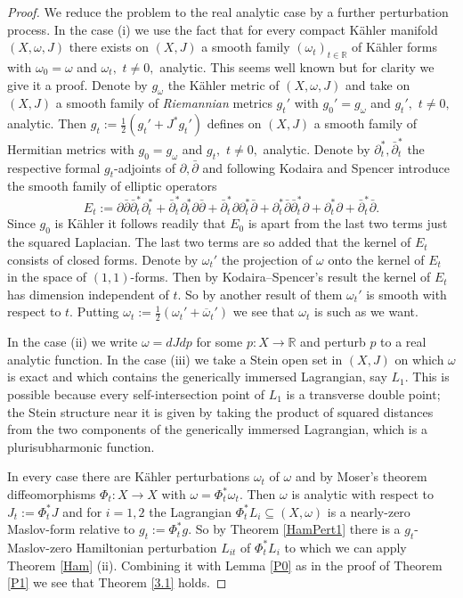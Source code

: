 \documentclass{article}
\theoremstyle{plain}%
\theoremstyle{definition}
\numberwithin{equation}{section}
\numberwithin{figure}{section}
\def\R{{\mathbin{\mathbb R}}}
\def\om{\omega}
\def\Ph{\Phi}
\def\d{{\partial}}
\def\db{\bar\d}%
\def\ov{\overline}
\def\hf{{\frac{1}{2}}}
\def\sb{\subseteq}
\begin{document}
\begin{proof}
We reduce the problem to the real analytic case by a further perturbation process.
In the case (i) we use the fact that
for every compact K\"ahler manifold $(X,\om,J)$
there exists on $(X,J)$ a smooth family $(\om_t)_{t\in\R}$ of K\"ahler forms with $\om_0=\om$ and $\om_t,$ $t\ne0,$ analytic.
This seems well known but for clarity we give it a proof.
Denote by $g_\om$ the K\"ahler metric of $(X,\om,J)$
and take on $(X,J)$ a smooth family of {\it Riemannian} metrics $g_t'$
with $g_0'=g_\om$ and $g_t',$ $t\ne0,$ analytic.
Then $g_t:=\hf(g_t'+J^*g_t')$ defines on $(X,J)$ a smooth family of Hermitian metrics with
$g_0=g_\om$ and $g_t,$ $t\ne0,$ analytic.
Denote by $\d_t^*,\db_t^*$ the respective formal $g_t$-adjoints of $\d,\db$
and following Kodaira and Spencer \cite[\S6]{KS}
introduce the smooth family of elliptic operators
\[E_t:=\d\db\db_t^*\d_t^*+\db_t^*\d_t^*\d\db+\db_t^*\d\d_t^*\db+
\d_t^*\db\db_t^*\d+\d_t^*\d+\db_t^*\db.\]
Since $g_0$ is K\"ahler it follows readily that 
$E_0$ is apart from the last two terms just the squared Laplacian.
The last two terms are so added that the kernel of $E_t$ consists of closed forms.
Denote by $\om_t'$ the projection of $\om$ onto the kernel of $E_t$ in the space of $(1,1)$-forms.
Then by Kodaira--Spencer's result \cite[Proposition 8]{KS} the kernel of $E_t$ has dimension independent of $t.$
So by another result of them \cite[Theorem 5]{KS} $\om_t'$ is smooth with respect to $t.$
Putting $\om_t:=\hf(\om_t'+\ov\om_t')$ we see that $\om_t$ is such as we want.

In the case (ii) we write $\om=dJdp$ for some $p:X\to\R$ and perturb $p$ to a real analytic function.
In the case (iii) we take a Stein open set in $(X,J)$ on which $\om$ is exact and which contains the generically immersed Lagrangian, say $L_1.$
This is possible because every self-intersection point of $L_1$ is a transverse double point;
the Stein structure near it is given by taking the product of squared distances from the two components of the generically immersed Lagrangian, which is a plurisubharmonic function.  

In every case there are K\"ahler perturbations $\om_t$ of $\om$ and by Moser's theorem diffeomorphisms $\Ph_t:X\to X$
with $\om=\Ph_t^*\om_t.$
Then $\om$ is analytic with respect to $J_t:=\Ph_t^*J$
and for $i=1,2$ the Lagrangian $\Ph_t^*L_i\sb(X,\om)$ is a nearly-zero Maslov-form
relative to $g_t:=\Ph_t^*g.$
So by Theorem \ref{HamPert1} there is a $g_t$-Maslov-zero Hamiltonian perturbation $L_{it}$ of $\Ph_t^*L_i$
to which we can apply Theorem \ref{Ham} (ii).
Combining it with Lemma \ref{P0} as in the proof of Theorem \ref{P1} we see that Theorem \ref{3.1} holds.  
\end{proof}
\end{document}
